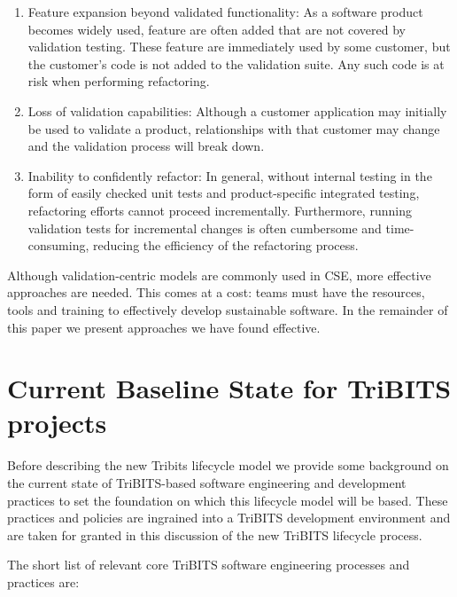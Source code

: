 \documentclass[11pt]{SANDreport}
\begin{document}
\begin{enumerate}

{}\item Feature expansion beyond validated functionality: As a
software product becomes widely used, feature are often added that are
not covered by validation testing.  These feature are immediately used
by some customer, but the customer's code is not added to the
validation suite.  Any such code is at risk when performing
refactoring.

{}\item Loss of validation capabilities: Although a customer
application may initially be used to validate a product, relationships
with that customer may change and the validation process will break
down.

{}\item Inability to confidently refactor: In general, without
internal testing in the form of easily checked unit tests and
product-specific integrated testing, refactoring efforts cannot
proceed incrementally.  Furthermore, running validation tests for
incremental changes is often cumbersome and time-consuming, reducing
the efficiency of the refactoring process.

\end{enumerate}

Although validation-centric models are commonly used in CSE, more
effective approaches are needed.  This comes at a cost: teams must
have the resources, tools and training to effectively develop
sustainable software.  In the remainder of this paper we present
approaches we have found effective.

%
{}\section{Current Baseline State for TriBITS projects}
\label{sec:tribts_current_state}
%

Before describing the new Tribits lifecycle model we provide some
background on the current state of TriBITS-based software engineering
and development practices to set the foundation on which this
lifecycle model will be based.  These practices and policies are
ingrained into a TriBITS development environment and are taken for
granted in this discussion of the new TriBITS lifecycle process.

The short list of relevant core TriBITS software engineering processes and
practices are:
\end{document}
